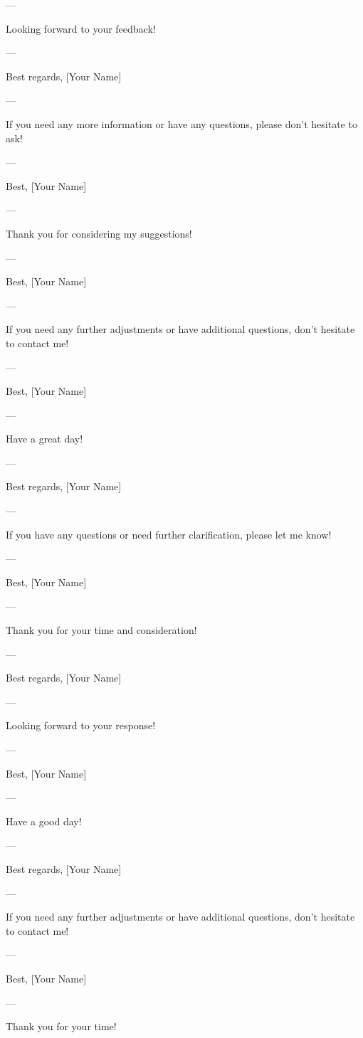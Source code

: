 --- 

Looking forward to your feedback! 

--- 

Best regards,  
[Your Name]  

--- 

If you need any more information or have any questions, please don't hesitate to ask! 

--- 

Best,  
[Your Name]  

--- 

Thank you for considering my suggestions! 

--- 

Best,  
[Your Name]  

--- 

If you need any further adjustments or have additional questions, don't hesitate to contact me! 

--- 

Best,  
[Your Name]  

--- 

Have a great day! 

--- 

Best regards,  
[Your Name]  

--- 

If you have any questions or need further clarification, please let me know! 

--- 

Best,  
[Your Name]  

--- 

Thank you for your time and consideration! 

--- 

Best regards,  
[Your Name]  

--- 

Looking forward to your response! 

--- 

Best,  
[Your Name]  

--- 

Have a good day! 

--- 

Best regards,  
[Your Name]  

--- 

If you need any further adjustments or have additional questions, don't hesitate to contact me! 

--- 

Best,  
[Your Name]  

--- 

Thank you for your time! 

